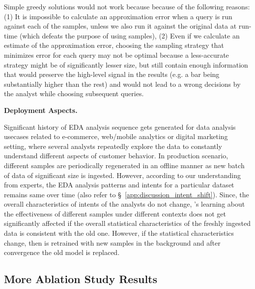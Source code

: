 Simple greedy solutions would not work because because of the following reasons:
(1) It is impossible to calculate an approximation error when a query is run against each of the samples, unless we also run it against the original data at run-time (which defeats the purpose of using samples), 
(2) Even if we calculate an estimate of the approximation error, choosing the sampling strategy that minimizes error for each query may not be optimal because a less-accurate strategy might be of significantly lesser size, but still contain enough information that would preserve the high-level signal in the results (e.g. a bar being substantially higher than the rest) and would not lead to a wrong decisions by the analyst while choosing subsequent queries.

\noindent\textbf{Deployment Aspects.}

Significant history of EDA analysis sequence gets generated for data analysis usecases related to e-commerce, web/mobile analytics or digital marketing setting, where several analysts repeatedly explore the data to constantly understand different aspects of customer behavior. 
%
In production scenario, different samples  are periodically regenerated in an offline manner as new batch of data of significant size is ingested. 
However, according to our understanding from experts, the EDA analysis patterns and intents for a particular dataset remains same over time (also refer to \S~\ref{app:discussion_intent_shift}).
Since, the overall characteristics of intents of the analysts do not change, \name{}'s learning about the effectiveness of different samples under different contexts does not get significantly affected if the overall statistical characteristics of the freshly ingested data is consistent with the old one.
However, if the statistical characteristics change, then \name{} is retrained with new samples in the background and after convergence the old model is replaced. 



\subsection{More Ablation Study Results}

